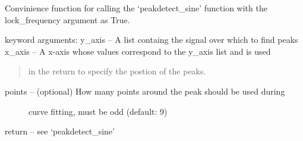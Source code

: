 \documentclass[letterpaper,10pt,english]{sphinxmanual}
\begin{document}

\begin{fulllineitems}
\label{code:peakdet.peakdetect_sine_locked}
Convinience function for calling the `peakdetect\_sine' function with
the lock\_frequency argument as True.

keyword arguments:
y\_axis -- A list containg the signal over which to find peaks
x\_axis -- A x-axis whose values correspond to the y\_axis list and is used
\begin{quote}

in the return to specify the postion of the peaks.
\end{quote}
\begin{description}
\item[{points -- (optional) How many points around the peak should be used during}] \leavevmode
curve fitting, must be odd (default: 9)

\end{description}

return -- see `peakdetect\_sine'

\end{fulllineitems}

\end{document}
